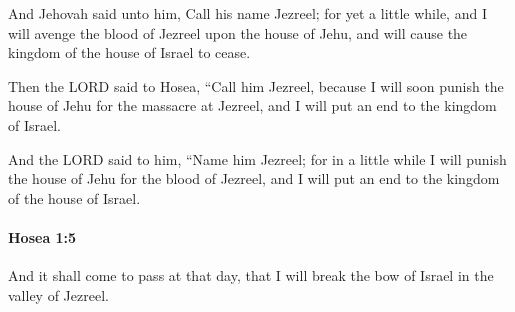 			\begin{versebox}
					\item[BHS] 
					\item[LXX] 
					\item[ASV] And Jehovah said unto him, Call his name Jezreel; for yet a little while, and I will avenge the blood of Jezreel upon the house of Jehu, and will cause the kingdom of the house of Israel to cease.
					\item[NIV] Then the LORD said to Hosea, “Call him Jezreel, because I will soon punish the house of Jehu for the massacre at Jezreel, and I will put an end to the kingdom of Israel.
					\item[NRSV] And the LORD said to him, “Name him Jezreel; for in a little while I will punish the house of Jehu for the blood of Jezreel, and I will put an end to the kingdom of the house of Israel.
			\end{versebox}

		\paragraph{Hosea 1:5} %
			\label{HOSEA-1-5}

			And it shall come to pass at that day, that I will break the bow of Israel in the valley of Jezreel.

